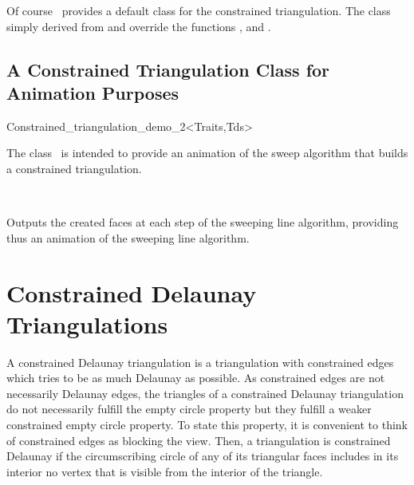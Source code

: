 Of course  \cgal\ provides a default  class
for the constrained triangulation. The class
simply derived from 
 and override the
functions ,  and 
.


\subsection{A Constrained Triangulation Class for Animation Purposes
\label{I1_Subsec_Constrained_Demo_2}}

\begin{ccClassTemplate}{Constrained_triangulation_demo_2<Traits,Tds>}

\ccDefinition
The class  \ccClassTemplateName\ is intended to provide
an animation of the sweep algorithm that builds a 
constrained triangulation.

\\


\ccInheritsFrom
{}

\ccTypes
{}
\ccThreeToTwo
{}

\ccCreation
{}

{Outputs the created faces at each step of
the sweeping line algorithm, providing thus an animation
of the sweeping line algorithm.}
\end{ccClassTemplate}


\section{Constrained Delaunay Triangulations}
\label{I1_Sect_Constrained_Delaunay_Triangulations}

A constrained Delaunay triangulation is a triangulation with
constrained edges which tries to be as much Delaunay as possible.
As constrained edges are not necessarily Delaunay edges,
the triangles of a constrained Delaunay triangulation do not
necessarily fulfill the empty circle property
but they fulfill a weaker constrained empty circle property.
 To state this property,
it is convenient to think of  constrained
edges as blocking the view. Then, a triangulation is 
constrained Delaunay if
 the circumscribing circle
of any of its triangular faces includes in its interior 
no vertex  that is visible
from the interior of the triangle.

